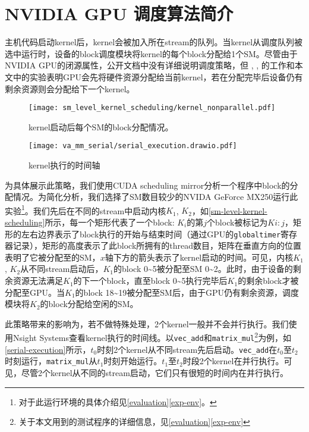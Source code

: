 \section{NVIDIA GPU 调度算法简介}\label{nvidia-sched}

主机代码启动kernel后，kernel会被加入所在stream的队列。当kernel从调度队列被选中运行时，设备的block调度模块将kernel的每个block分配给1个SM。尽管由于NVIDIA GPU的闭源属性，公开文档中没有详细说明调度策略，但 \citet{8277284}, \citet{9113104}, \citet{8853389}的工作和本文中的实验表明GPU会先将硬件资源分配给当前kernel，若在分配完毕后设备仍有剩余资源则会分配给下一个kernel。

\begin{figure}[htbp]
    \centering
    \texttt{[image: sm\_level\_kernel\_scheduling/kernel\_nonparallel.pdf]}
    \caption{kernel启动后每个SM的block分配情况。}
    \label{sm-level-kernel-scheduling}
\end{figure}

\begin{figure}[htbp]
    \centering
    \texttt{[image: va\_mm\_serial/serial\_execution.drawio.pdf]}
    \caption{kernel执行的时间轴}
    \label{serial-execution}
\end{figure}

为具体展示此策略，我们使用CUDA scheduling mirror\cite{otterness2017inferring}分析一个程序中block的分配情况。为简化分析，我们选择了SM数目较少的NVIDA GeForce MX250运行此实验\footnote{对于此运行环境的具体介绍见\autoref{evaluation}\autoref{exp-env}。}。我们先后在不同的stream中启动内核$K_1$, $K_2$，如\autoref{sm-level-kernel-scheduling}所示，每一个矩形代表了一个block: $K_i$的第$j$个block被标记为$Ki:j$，矩形的左右边界表示了block执行的开始与结束时间（通过GPU的\texttt{globaltimer}寄存器记录），矩形的高度表示了此block所拥有的thread数目，矩阵在垂直方向的位置表明了它被分配至的SM，$x$轴下方的箭头表示了kernel启动的时间。可见，内核$K_1$, $K_2$从不同stream启动后，$K_1$的block 0\textasciitilde 5被分配至SM 0\textasciitilde 2。此时，由于设备的剩余资源无法满足$K_1$的下一个block，直至block 0\textasciitilde 5执行完毕后$K_1$的剩余block才被分配至GPU。当$K_1$的block 18\textasciitilde 19被分配至SM后，由于GPU仍有剩余资源，调度模块将$K_2$的block分配给空闲的SM。

此策略带来的影响为，若不做特殊处理，2个kernel一般并不会并行执行。我们使用Nsight Systems\cite{nsightsystems}查看kernel执行的时间线。以\texttt{vec\_add}和\texttt{matrix\_mul}\footnote{关于本文用到的测试程序的详细信息，见\autoref{evaluation}\autoref{exp-env}}为例，如\autoref{serial-execution}所示，$t_0$时刻2个kernel从不同stream先后启动。\texttt{vec\_add}在$t_0$至$t_2$时刻运行，\texttt{matrix\_mul}从$t_1$时刻开始运行。$t_1$至$t_2$时段2个kernel在并行执行。可见，尽管2个kernel从不同的stream启动，它们只有很短的时间内在并行执行。

